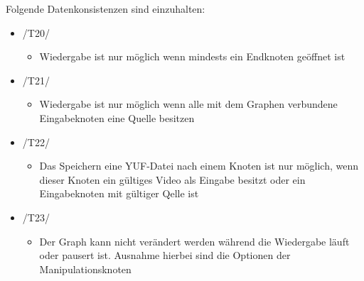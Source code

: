 \documentclass{article}
\begin{document}
\newpage
Folgende Datenkonsistenzen sind einzuhalten:
\begin{itemize}
	\item /T20/
		\begin{itemize}
			\item Wiedergabe ist nur möglich wenn mindests ein Endknoten geöffnet ist
		\end{itemize}
	\item /T21/
		\begin{itemize}
			\item Wiedergabe ist nur möglich wenn alle mit dem Graphen verbundene Eingabeknoten eine Quelle besitzen
		\end{itemize}
	\item /T22/
		\begin{itemize}
			\item Das Speichern eine YUF-Datei nach einem Knoten ist nur möglich, wenn dieser Knoten ein gültiges Video als Eingabe besitzt oder ein Eingabeknoten mit 
			gültiger Qelle ist
		\end{itemize}
	\item /T23/
		\begin{itemize}
			\item Der Graph kann nicht verändert werden während die Wiedergabe läuft oder pausert ist. Ausnahme hierbei sind die Optionen der Manipulationsknoten
		\end{itemize}
	\end{itemize}
\end{document}
